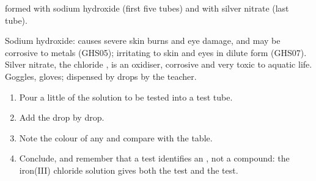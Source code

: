 \begin{omfigure}

{\small {} formed with sodium hydroxide (first five tubes) and
with silver nitrate (last tube).}
\end{omfigure}

\begin{safety}{}
Sodium hydroxide: causes severe skin burns and eye damage, and may be
corrosive to metals (GHS05); irritating to skin and eyes in dilute form
(GHS07). Silver nitrate, the chloride
, is an oxidiser, corrosive and very toxic to aquatic life.
Goggles, gloves;  dispensed by drops by the teacher.
\end{safety}

\begin{method}\label{met:g9:ions:test}
\begin{enumerate}
  \item Pour a little of the solution to be tested into a test tube.
  \item Add the  drop by drop.
  \item Note the colour of any  and compare with the table.
  \item Conclude, and remember that a test identifies an , not a
        compound: the iron(III) chloride solution gives both the
         test and the  test.
\end{enumerate}
\end{method}

